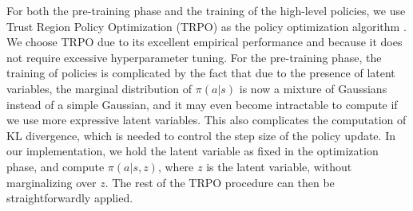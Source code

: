 \documentclass{article} %
\begin{document}
For both the pre-training phase and the training of the high-level policies, we use Trust Region Policy Optimization (TRPO) as the policy optimization algorithm \citep{Schulman15TRPO}. We choose TRPO due to its excellent empirical performance and because it does not require excessive hyperparameter tuning. For the pre-training phase, the training of policies is complicated by the fact that due to the presence of latent variables, the marginal distribution of $\pi(a|s)$ is now a mixture of Gaussians instead of a simple Gaussian, and it may even become intractable to compute if we use more expressive latent variables. This also complicates the computation of KL divergence, which is needed to control the step size of the policy update. In our implementation, we hold the latent variable as fixed in the optimization phase, and compute $\pi(a|s,z)$, where $z$ is the latent variable, without marginalizing over $z$. The rest of the TRPO procedure can then be straightforwardly applied. %








\end{document}
